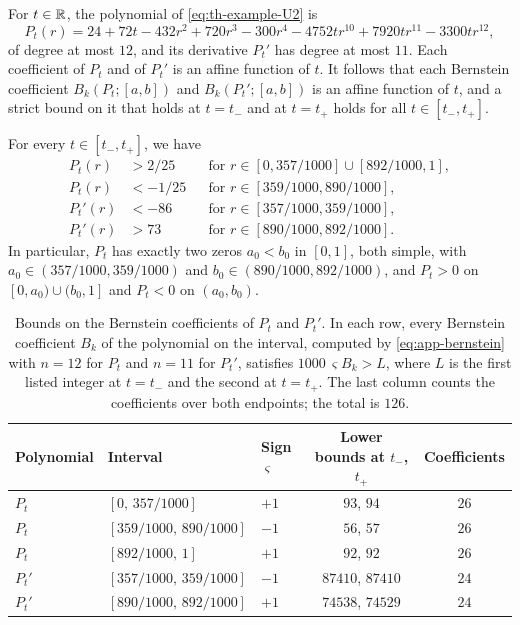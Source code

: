 For $t\in\mathbb R$, the polynomial of \eqref{eq:th-example-U2} is
\begin{equation}\label{eq:app-Pt}
P_t(r)=24+72t-432r^2+720r^3-300r^4-4752tr^{10}+7920tr^{11}-3300tr^{12},
\end{equation}
of degree at most $12$, and its derivative $P_t'$ has degree at most $11$. Each coefficient of $P_t$ and of $P_t'$ is an affine function of $t$. It follows that each Bernstein coefficient $B_k(P_t;[a,b])$ and $B_k(P_t';[a,b])$ is an affine function of $t$, and a strict bound on it that holds at $t=t_-$ and at $t=t_+$ holds for all $t\in[t_-,t_+]$.

\begin{lemma}\label{lem:app-sign}
For every $t\in[t_-,t_+]$, we have
\[
\begin{aligned}
P_t(r)&>2/25&&\text{for }r\in[0,357/1000]\cup[892/1000,1],\\
P_t(r)&<-1/25&&\text{for }r\in[359/1000,890/1000],\\
P_t'(r)&<-86&&\text{for }r\in[357/1000,359/1000],\\
P_t'(r)&>73&&\text{for }r\in[890/1000,892/1000].
\end{aligned}
\]
In particular, $P_t$ has exactly two zeros $a_0<b_0$ in $[0,1]$, both simple, with $a_0\in(357/1000,359/1000)$ and $b_0\in(890/1000,892/1000)$, and $P_t>0$ on $[0,a_0)\cup(b_0,1]$ and $P_t<0$ on $(a_0,b_0)$.
\end{lemma}

\begin{table}[htb]
\centering
\small
\begin{tabular}{@{}lllcc@{}}
\toprule
Polynomial & Interval & Sign $\varsigma$ & Lower bounds at $t_-$, $t_+$ & Coefficients\\
\midrule
$P_t$ & $[0,\,357/1000]$ & $+1$ & $93$, $94$ & $26$\\
$P_t$ & $[359/1000,\,890/1000]$ & $-1$ & $56$, $57$ & $26$\\
$P_t$ & $[892/1000,\,1]$ & $+1$ & $92$, $92$ & $26$\\
$P_t'$ & $[357/1000,\,359/1000]$ & $-1$ & $87410$, $87410$ & $24$\\
$P_t'$ & $[890/1000,\,892/1000]$ & $+1$ & $74538$, $74529$ & $24$\\
\bottomrule
\end{tabular}
\caption{Bounds on the Bernstein coefficients of $P_t$ and $P_t'$. In each row, every Bernstein coefficient $B_k$ of the polynomial on the interval, computed by \eqref{eq:app-bernstein} with $n=12$ for $P_t$ and $n=11$ for $P_t'$, satisfies $1000\,\varsigma B_k>L$, where $L$ is the first listed integer at $t=t_-$ and the second at $t=t_+$. The last column counts the coefficients over both endpoints; the total is $126$.}
\label{tab:app-bernstein}
\end{table}

